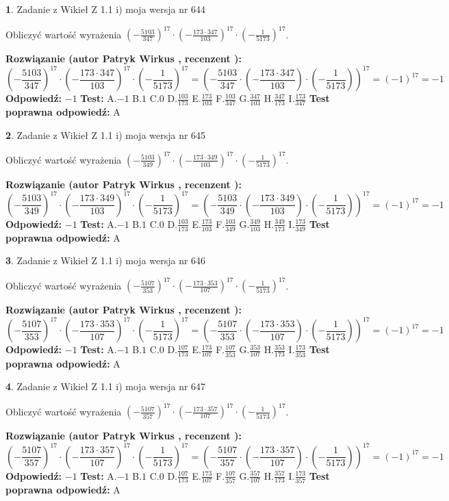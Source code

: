 \documentclass[12pt, a4paper]{article}
\theoremstyle{definition} %
\newtheorem{zad}{}
\newcommand{\zadStart}[1]{\begin{zad}#1\newline}
\newcommand{\zadStop}{\end{zad}}
\newcommand{\rozwStart}[2]{\noindent \textbf{Rozwiązanie (autor #1 , recenzent #2): }\newline}
\newcommand{\rozwStop}{\newline}
\newcommand{\odpStart}{\noindent \textbf{Odpowiedź:}\newline}
\newcommand{\odpStop}{\newline}
\newcommand{\testStart}{\noindent \textbf{Test:}\newline}
\newcommand{\testStop}{\newline}
\newcommand{\kluczStart}{\noindent \textbf{Test poprawna odpowiedź:}\newline}
\newcommand{\kluczStop}{\newline}
\begin{document}
\zadStart{Zadanie z Wikieł Z 1.1 i) moja wersja nr 644}

Obliczyć wartość wyrażenia $(-\frac{5103}{347})^{17} \cdot (-\frac{173 \cdot 347}{103})^{17} \cdot (-\frac{1}{5173})^{17}$.
\zadStop
\rozwStart{Patryk Wirkus}{}
$$(-\frac{5103}{347})^{17} \cdot (-\frac{173 \cdot 347}{103})^{17} \cdot (-\frac{1}{5173})^{17} = (-\frac{5103}{347} \cdot (-\frac{173 \cdot 347}{103}) \cdot (-\frac{1}{5173}))^{17} = (-1)^{17} = -1$$
\rozwStop
\odpStart
$-1$
\odpStop
\testStart
A.$-1$ B.$1$ C.$0$ D.$\frac{103}{173}$ E.$\frac{173}{103}$
F.$\frac{103}{347}$ G.$\frac{347}{103}$
H.$\frac{347}{173}$
I.$\frac{173}{347}$
\testStop
\kluczStart
A
\kluczStop



\zadStart{Zadanie z Wikieł Z 1.1 i) moja wersja nr 645}

Obliczyć wartość wyrażenia $(-\frac{5103}{349})^{17} \cdot (-\frac{173 \cdot 349}{103})^{17} \cdot (-\frac{1}{5173})^{17}$.
\zadStop
\rozwStart{Patryk Wirkus}{}
$$(-\frac{5103}{349})^{17} \cdot (-\frac{173 \cdot 349}{103})^{17} \cdot (-\frac{1}{5173})^{17} = (-\frac{5103}{349} \cdot (-\frac{173 \cdot 349}{103}) \cdot (-\frac{1}{5173}))^{17} = (-1)^{17} = -1$$
\rozwStop
\odpStart
$-1$
\odpStop
\testStart
A.$-1$ B.$1$ C.$0$ D.$\frac{103}{173}$ E.$\frac{173}{103}$
F.$\frac{103}{349}$ G.$\frac{349}{103}$
H.$\frac{349}{173}$
I.$\frac{173}{349}$
\testStop
\kluczStart
A
\kluczStop



\zadStart{Zadanie z Wikieł Z 1.1 i) moja wersja nr 646}

Obliczyć wartość wyrażenia $(-\frac{5107}{353})^{17} \cdot (-\frac{173 \cdot 353}{107})^{17} \cdot (-\frac{1}{5173})^{17}$.
\zadStop
\rozwStart{Patryk Wirkus}{}
$$(-\frac{5107}{353})^{17} \cdot (-\frac{173 \cdot 353}{107})^{17} \cdot (-\frac{1}{5173})^{17} = (-\frac{5107}{353} \cdot (-\frac{173 \cdot 353}{107}) \cdot (-\frac{1}{5173}))^{17} = (-1)^{17} = -1$$
\rozwStop
\odpStart
$-1$
\odpStop
\testStart
A.$-1$ B.$1$ C.$0$ D.$\frac{107}{173}$ E.$\frac{173}{107}$
F.$\frac{107}{353}$ G.$\frac{353}{107}$
H.$\frac{353}{173}$
I.$\frac{173}{353}$
\testStop
\kluczStart
A
\kluczStop



\zadStart{Zadanie z Wikieł Z 1.1 i) moja wersja nr 647}

Obliczyć wartość wyrażenia $(-\frac{5107}{357})^{17} \cdot (-\frac{173 \cdot 357}{107})^{17} \cdot (-\frac{1}{5173})^{17}$.
\zadStop
\rozwStart{Patryk Wirkus}{}
$$(-\frac{5107}{357})^{17} \cdot (-\frac{173 \cdot 357}{107})^{17} \cdot (-\frac{1}{5173})^{17} = (-\frac{5107}{357} \cdot (-\frac{173 \cdot 357}{107}) \cdot (-\frac{1}{5173}))^{17} = (-1)^{17} = -1$$
\rozwStop
\odpStart
$-1$
\odpStop
\testStart
A.$-1$ B.$1$ C.$0$ D.$\frac{107}{173}$ E.$\frac{173}{107}$
F.$\frac{107}{357}$ G.$\frac{357}{107}$
H.$\frac{357}{173}$
I.$\frac{173}{357}$
\testStop
\kluczStart
A
\kluczStop
\end{document}
